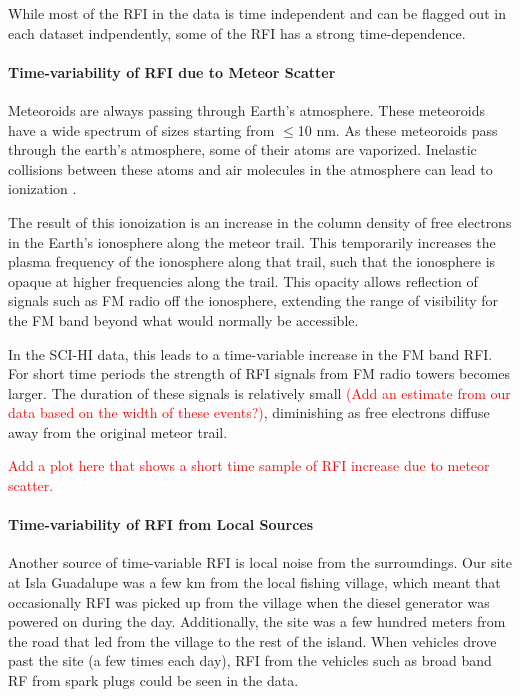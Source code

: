 While most of the RFI in the data is time independent and can be flagged out in each dataset indpendently, some of the RFI has a strong time-dependence. 

\paragraph{Time-variability of RFI due to Meteor Scatter}

Meteoroids are always passing through Earth's atmosphere. These meteoroids have a wide spectrum of sizes starting from $\leq$10 nm. As these meteoroids pass through the earth's atmosphere, some of their atoms are vaporized. Inelastic collisions between these atoms and air molecules in the atmosphere can lead to ionization \cite{meteor_review}. 

The result of this ionoization is an increase in the column density of free electrons  in the Earth's ionosphere along the meteor trail. This temporarily increases the plasma frequency of the ionosphere along that trail, such that the ionosphere is opaque at higher frequencies along the trail. This opacity allows reflection of signals such as FM radio off the ionosphere, extending the range of visibility for the FM band beyond what would normally be accessible.

In the SCI-HI data, this leads to a time-variable increase in the FM band RFI. For short time periods the strength of RFI signals from FM radio towers becomes larger. The duration of these signals is relatively small \textcolor{red}{(Add an estimate from our data based on the width of these events?)}, diminishing as free electrons diffuse away from the original meteor trail. 

\textcolor{red}{Add a plot here that shows a short time sample of RFI increase due to meteor scatter.}

\paragraph{Time-variability of RFI from Local Sources}

Another source of time-variable RFI is local noise from the surroundings. Our site at Isla Guadalupe was a few km from the local fishing village, which meant that occasionally RFI was picked up from the village when the diesel generator was powered on during the day. Additionally, the site was a few hundred meters from the road that led from the village to the rest of the island. When vehicles drove past the site (a few times each day), RFI from the vehicles such as broad band RF from spark plugs could be seen in the data. 

